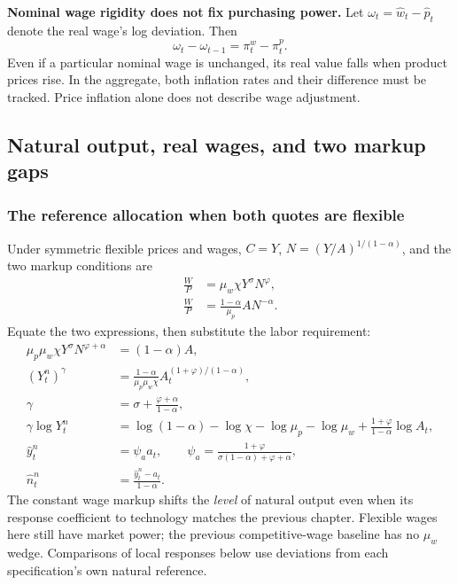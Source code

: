 \begin{blueblock}
\textbf{Nominal wage rigidity does not fix purchasing power.}
Let $\omega_t=\hat w_t-\hat p_t$ denote the real wage's log deviation. Then
\[
 \omega_t-\omega_{t-1}=\pi_t^w-\pi_t^p.
\]
Even if a particular nominal wage is unchanged, its real value falls when
product prices rise. In the aggregate, both inflation rates and their difference
must be tracked. Price inflation alone does not describe wage adjustment.
\end{blueblock}

\subsection{Natural output, real wages, and two markup gaps}

\subsubsection{The reference allocation when both quotes are flexible}

Under symmetric flexible prices and wages, $C=Y$, $N=(Y/A)^{1/(1-\alpha)}$,
and the two markup conditions are
\begin{align}
 \frac WP&=\mu_w\chi Y^\sigma N^\varphi,\\
 \frac WP&=\frac{1-\alpha}{\mu_p}AN^{-\alpha}.
\end{align}
Equate the two expressions, then substitute the labor requirement:
\begin{align}
 \mu_p\mu_w\chi Y^\sigma N^{\varphi+\alpha}&=(1-\alpha)A,\\
 (Y_t^n)^\gamma
 &=\frac{1-\alpha}{\mu_p\mu_w\chi}
             A_t^{(1+\varphi)/(1-\alpha)},\\
 \gamma&=\sigma+\frac{\varphi+\alpha}{1-\alpha},\\
 \gamma\log Y_t^n
 &=\log(1-\alpha)-\log\chi-\log\mu_p-\log\mu_w
                        +\frac{1+\varphi}{1-\alpha}\log A_t,\\
 \hat y_t^n&=\psi_a a_t,\qquad
 \psi_a=\frac{1+\varphi}{\sigma(1-\alpha)+\varphi+\alpha},\\
 \hat n_t^n&=\frac{\hat y_t^n-a_t}{1-\alpha}.
\end{align}
The constant wage markup shifts the \emph{level} of natural output even when
its response coefficient to technology matches the previous chapter. Flexible
wages here still have market power; the previous competitive-wage baseline
has no $\mu_w$ wedge. Comparisons of local responses below use deviations
from each specification's own natural reference.

